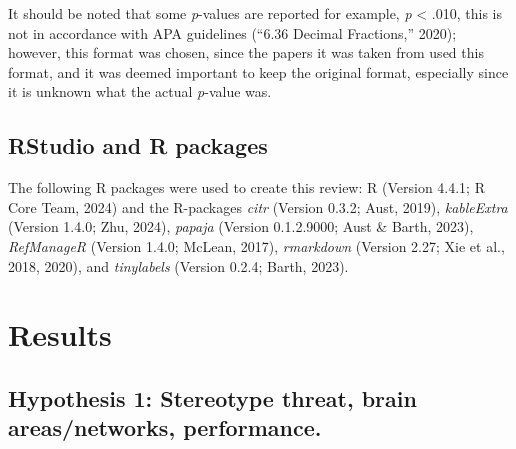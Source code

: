 \documentclass[
  stu, a4paper,floatsintext]{apa7}
\begin{document}
It should be noted that some \emph{p}-values are reported for example, \emph{p} \textless{} .010, this is not in accordance with APA guidelines ({``6.36 {Decimal Fractions},''} 2020); however, this format was chosen, since the papers it was taken from used this format, and it was deemed important to keep the original format, especially since it is unknown what the actual \emph{p}-value was.

\subsection{RStudio and R packages}\label{rstudio-and-r-packages}

The following R packages were used to create this review: R (Version 4.4.1; R Core Team, 2024) and the R-packages \emph{citr} (Version 0.3.2; Aust, 2019), \emph{kableExtra} (Version 1.4.0; Zhu, 2024), \emph{papaja} (Version 0.1.2.9000; Aust \& Barth, 2023), \emph{RefManageR} (Version 1.4.0; McLean, 2017), \emph{rmarkdown} (Version 2.27; Xie et al., 2018, 2020), and \emph{tinylabels} (Version 0.2.4; Barth, 2023).

\section{Results}\label{results}

\subsection{Hypothesis 1: Stereotype threat, brain areas/networks, performance.}\label{hypothesis-1-stereotype-threat-brain-areasnetworks-performance.}
\end{document}
